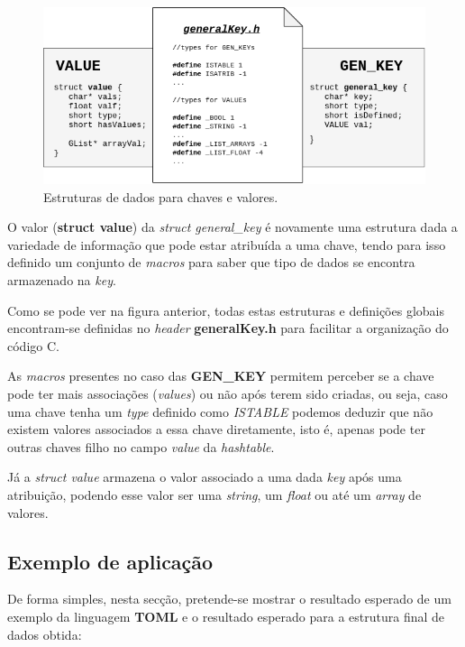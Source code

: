 \documentclass[a4paper,12pt]{report}
\begin{document}
\begin{figure}[H]
    \centering
    \includegraphics[scale=0.5]{images/PL_TP2_Structures-P2.png}
    \caption{Estruturas de dados para chaves e valores.}
    \label{fig:my_label}
\end{figure}

O valor (\textbf{struct value}) da \textit{struct general\_key} é novamente uma estrutura dada a variedade de informação que pode estar atribuída a uma chave, tendo para isso definido um conjunto de \textit{macros} para saber que tipo de dados se encontra armazenado na \textit{key}.
\par
Como se pode ver na figura anterior, todas estas estruturas e definições globais encontram-se definidas no \textit{header} \textbf{generalKey.h} para facilitar a organização do código C.
\par
As \textit{macros} presentes no caso das \textbf{GEN\_KEY} permitem perceber se a chave pode ter mais associações (\textit{values})
 ou não após terem sido criadas, ou seja, caso uma chave tenha um \textit{type} definido como \textit{ISTABLE} podemos deduzir que não existem valores associados a essa chave diretamente, isto é, apenas pode ter outras chaves filho no campo \textit{value} da \textit{hashtable}.
\par
Já a \textit{struct value} armazena o valor associado a uma dada \textit{key} após uma atribuição, podendo esse valor ser uma \textit{string}, um \textit{float} ou até um \textit{array} de valores.

\subsection{Exemplo de aplicação}

De forma simples, nesta secção, pretende-se mostrar o resultado esperado de um exemplo da linguagem \textbf{TOML} e o resultado esperado para a estrutura final de dados obtida:
\end{document}
